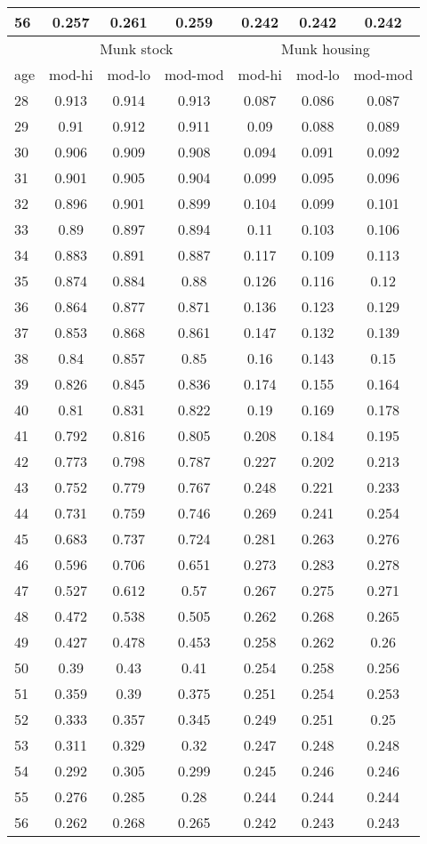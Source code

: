 \begin{longtable}{|l|ccc|ccc|}
56&0.257&0.261&0.259&0.242&0.242&0.242\\
		\hline
		&\multicolumn{3}{c|}{Munk stock}&\multicolumn{3}{c|}{Munk housing}\\
		\hline
		age&mod-hi&mod-lo&mod-mod&mod-hi&mod-lo&mod-mod\\
		\hline
28&0.913&0.914&0.913&0.087&0.086&0.087\\
29&0.91&0.912&0.911&0.09&0.088&0.089\\
30&0.906&0.909&0.908&0.094&0.091&0.092\\
31&0.901&0.905&0.904&0.099&0.095&0.096\\
32&0.896&0.901&0.899&0.104&0.099&0.101\\
33&0.89&0.897&0.894&0.11&0.103&0.106\\
34&0.883&0.891&0.887&0.117&0.109&0.113\\
35&0.874&0.884&0.88&0.126&0.116&0.12\\
36&0.864&0.877&0.871&0.136&0.123&0.129\\
37&0.853&0.868&0.861&0.147&0.132&0.139\\
38&0.84&0.857&0.85&0.16&0.143&0.15\\
39&0.826&0.845&0.836&0.174&0.155&0.164\\
40&0.81&0.831&0.822&0.19&0.169&0.178\\
41&0.792&0.816&0.805&0.208&0.184&0.195\\
42&0.773&0.798&0.787&0.227&0.202&0.213\\
43&0.752&0.779&0.767&0.248&0.221&0.233\\
44&0.731&0.759&0.746&0.269&0.241&0.254\\
45&0.683&0.737&0.724&0.281&0.263&0.276\\
46&0.596&0.706&0.651&0.273&0.283&0.278\\
47&0.527&0.612&0.57&0.267&0.275&0.271\\
48&0.472&0.538&0.505&0.262&0.268&0.265\\
49&0.427&0.478&0.453&0.258&0.262&0.26\\
50&0.39&0.43&0.41&0.254&0.258&0.256\\
51&0.359&0.39&0.375&0.251&0.254&0.253\\
52&0.333&0.357&0.345&0.249&0.251&0.25\\
53&0.311&0.329&0.32&0.247&0.248&0.248\\
54&0.292&0.305&0.299&0.245&0.246&0.246\\
55&0.276&0.285&0.28&0.244&0.244&0.244\\
56&0.262&0.268&0.265&0.242&0.243&0.243\\

\end{longtable}
